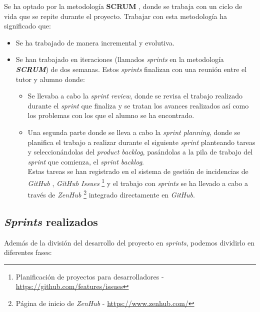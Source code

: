 Se ha optado por la metodología \textbf{SCRUM} \cite{scrum_master_scrum_2019}, donde se trabaja con un ciclo de vida que se repite durante el proyecto. Trabajar con esta metodología ha significado que:
\begin{itemize}
	\item Se ha trabajado de manera incremental y evolutiva.
	\item Se han trabajado en iteraciones (llamados \textit{sprints} en la metodología \textbf{\textit{SCRUM}}) de dos semanas. Estos \textit{sprints} finalizan con una reunión entre el tutor y alumno donde:
	\begin{itemize}
		\item Se llevaba a cabo la \textit{sprint review}, donde se revisa el trabajo realizado durante el \textit{sprint} que finaliza y se tratan los avances realizados así como los problemas con los que el alumno se ha encontrado.
				\item Una segunda parte donde se lleva a cabo la \textit{sprint planning}, donde se planifica el trabajo a realizar durante el siguiente \textit{sprint} planteando tareas y seleccionándolas del \textit{product backlog}, pasándolas a la pila de trabajo del \textit{sprint} que comienza, el \textit{sprint backlog}.\\
				Estas tareas se han registrado en el sistema de gestión de incidencias de \textit{GitHub} , \textit{GitHub Issues} \footnote{Planificación de proyectos para desarrolladores - \url{https://github.com/features/issues}} y el trabajo con \textit{sprints} se ha llevado a cabo a través de \textit{ZenHub} \footnote{Página de inicio de \textit{ZenHub} - \url{https://www.zenhub.com/}} integrado directamente en \textit{GitHub}.
	\end{itemize}
\end{itemize}

\subsection{\textit{Sprints} realizados}

Además de la división del desarrollo del proyecto en \textit{sprints}, podemos dividirlo en diferentes fases:



